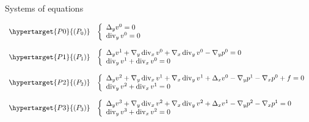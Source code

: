 \documentclass[pdf,umbc4,slideColor,colorBG]{prosper}
\renewcommand{\div}{\mathop\mathrm{div}\nolimits}	%
\begin{document}
\begin{slide}{Systems of equations}

\[
\begin{array}{ll}

\hypertarget{P0}{(P_0)} &

\left\{
\begin{array}{l}
\Delta_y  v^{0} = 0 \\
\div_y  v^{0} = 0
\end{array}
\right.

\bigskip \\

\hypertarget{P1}{(P_1)} &

\left\{
\begin{array}{l}
	\Delta_y  v^{1} + \nabla_y \div_x  v^{0} + \nabla_x \div_y  v^{0}
		- \nabla_y p^{0} = 0 \\
	\div_y  v^{1}  + \div_x  v^{0} = 0
\end{array}
\right.

\bigskip \\

\hypertarget{P2}{(P_2)} &

\left\{
\begin{array}{l}
	\Delta_y  v^{2} + \nabla_y \div_x  v^{1}
		+ \nabla_x \div_y  v^{1} + \Delta_x  v^{0} - \nabla_y p^{1}
		- \nabla_x p^{0} + f = 0 \\
	\div_y  v^{2}  + \div_x  v^{1} = 0
\end{array}
\right.

\bigskip \\

\hypertarget{P3}{(P_3)} &

\left\{
\begin{array}{l}
	\Delta_y  v^{3} + \nabla_y \div_x  v^{2}
		+ \nabla_x \div_y  v^{2} \mbox{} + \Delta_x  v^{1}
		- \nabla_y p^{2} - \nabla_x p^{1} = 0 \\
	\div_y  v^{3}  + \div_x  v^{2} = 0
\end{array}
\right.

\end{array}
\]

\end{slide}

\end{document}
